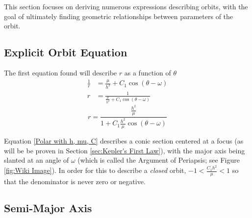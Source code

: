 \documentclass[../basicOrbitalDynamics.tex]{subfiles}
\begin{document}
This section focuses on deriving numerous expressions describing orbits, with the goal of ultimately finding geometric relationships between parameters of the orbit.

\bigskip\bigskip
\subsection{Explicit Orbit Equation}

The first equation found will describe $r$ as a function of $\theta$
\begin{align*}
    \frac{1}{r} & =\frac{\mu}{h^2}+C_1\cos(\theta-\omega)           \\
    r           & =\frac{1}{\frac{\mu}{h^2}+C_1\cos(\theta-\omega)}
\end{align*}
\begin{equation}\label{Polar with h, mu, C}
    r=\frac{\frac{h^2}{\mu}}{1+C_1\frac{h^2}{\mu}\cos(\theta-\omega)}
\end{equation}

Equation \eqref{Polar with h, mu, C} describes a conic section centered at a focus (as will be be proven in Section \ref{sec:Kepler's First Law}), with the major axis being slanted at an angle of $\omega$ (which is called the Argument of Periapsis; see Figure \ref{fig:Wiki Image}). In order for this to describe a \textit{closed} orbit, $-1<\frac{C_1h^2}{\mu}<1$ so that the denominator is never zero or negative.




\subsection{Semi-Major Axis}
\end{document}
